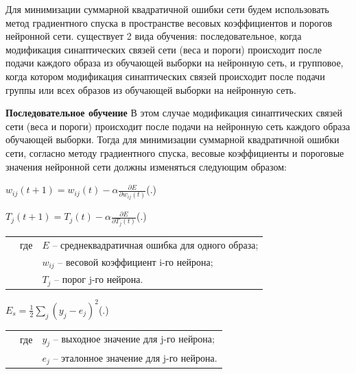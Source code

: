 	\par \redline Для минимизации суммарной квадратичной ошибки сети будем использовать метод градиентного спуска в пространстве весовых коэффициентов и порогов нейронной сети. существует 2 вида обучения: последовательное, когда модификация
	синаптических связей сети (веса и пороги) происходит после подачи
	каждого образа из обучающей выборки на нейронную сеть, и групповое, когда котором модификация синаптических связей происходит после подачи группы или всех образов из
	обучающей выборки на нейронную сеть. 
	
	\par \redline \textbf{Последовательное обучение } В этом случае модификация синаптических связей сети (веса и пороги) происходит после подачи на нейронную сеть каждого образа обучающей выборки. Тогда для минимизации суммарной квадратичной
	ошибки сети, согласно методу градиентного спуска, весовые коэффициенты и пороговые значения нейронной сети должны изменяться следующим образом:
	
	\formulaspace \par \redline 
	$w_{ij}(t+1) = w_{ij}(t) - \alpha \frac{\partial E}{\partial w_{ij}(t)} $\hfill (\thechaptercntr .\theformulacntr) \redline
	\formulaspace \addtocounter{formulacntr}{1}
	
	\formulaspace \par \redline 
	$T_{j}(t+1) = T_{j}(t) - \alpha \frac{\partial E}{\partial T_{j}(t)} $\hfill (\thechaptercntr .\theformulacntr) \redline
	\formulaspace \addtocounter{formulacntr}{1}
	
	\begin{tabular}{p{}p{}p{}}
		& где  & $E$ {--} среднеквадратичная ошибка для одного образа; \\
		&      &  $w_{ij}$ {--} весовой коэффициент i-го нейрона; \\
		&      & $T_{j}$ {--} порог j-го нейрона. \\
	\end{tabular}
	
	\formulaspace \par \redline 
	$E_{s} = \frac{1}{2} \sum \limits _{j}^{} (y_{j} - e_{j})^{2} $\hfill (\thechaptercntr .\theformulacntr) \redline
	\formulaspace \addtocounter{formulacntr}{1}
	
	\begin{tabular}{p{}p{}p{}}
		& где  & $y_{j}$ {--} выходное значение для j-го нейрона; \\
		&      & $e_{j}$ {--} эталонное значение для j-го нейрона. \\
	\end{tabular}
	
